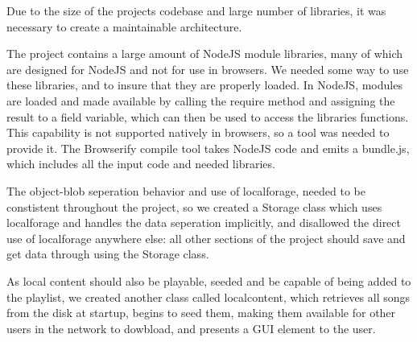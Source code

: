 Due to the size of the projects codebase and large number of libraries, it was necessary to create a maintainable architecture.

The project contains a large amount of NodeJS module libraries, 
many of which are designed for NodeJS and not for use in browsers.
We needed some way to use these libraries, and to insure that they are properly loaded.
In NodeJS, modules are loaded and made available by calling the require method 
and assigning the result to a field variable, which can then be used to access the libraries functions.
This capability is not supported natively in browsers, so a tool was needed to provide it.
The Browserify compile tool takes NodeJS code and emits a bundle.js, 
which includes all the input code and needed libraries. 






The object-blob seperation behavior and use of localforage,
needed to be constistent throughout the project, 
so we created a Storage class which uses localforage and handles the data seperation implicitly, 
and disallowed the direct use of localforage anywhere else: all other sections of the project should save and get data through using the Storage class.

As local content should also be playable, 
seeded and be capable of being added to the playlist, 
we created another class called localcontent,
which retrieves all songs from the disk at startup,
begins to seed them, making them available for other users in the network to dowbload,
and presents a GUI element to the user.



